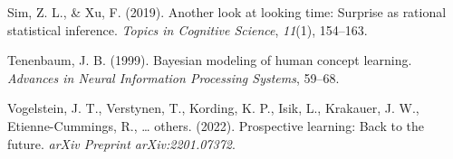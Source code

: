 \documentclass[10pt, letterpaper]{article}
\newenvironment{CSLReferences}%
  {}%
  {\par}
\begin{document}
\begin{CSLReferences}{1}{0}
\leavevmode{}%
Sim, Z. L., \& Xu, F. (2019). Another look at looking time: Surprise as
rational statistical inference. \emph{Topics in Cognitive Science},
\emph{11}(1), 154--163.

\leavevmode{}%
Tenenbaum, J. B. (1999). Bayesian modeling of human concept learning.
\emph{Advances in Neural Information Processing Systems}, 59--68.

\leavevmode{}%
Vogelstein, J. T., Verstynen, T., Kording, K. P., Isik, L., Krakauer, J.
W., Etienne-Cummings, R., \ldots{} others. (2022). Prospective learning:
Back to the future. \emph{arXiv Preprint arXiv:2201.07372}.

\end{CSLReferences}


\end{document}
